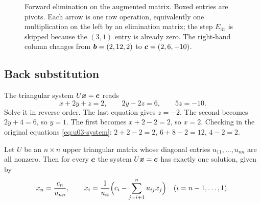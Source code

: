 \begin{figure}[ht]
\centering
\small
{}
\caption{Forward elimination on the augmented matrix. Boxed entries are pivots. Each arrow is
one row operation, equivalently one multiplication on the left by an elimination matrix; the
step $E_{31}$ is skipped because the $(3,1)$ entry is already zero. The right-hand column
changes from $\boldsymbol{b}=(2,12,2)$ to $\boldsymbol{c}=(2,6,-10)$.}\label{fig:u03-flow}
\end{figure}

\subsection{Back substitution}

The triangular system $U\boldsymbol{x}=\boldsymbol{c}$ reads
\[
  x+2y+z=2,\qquad 2y-2z=6,\qquad 5z=-10 .
\]
Solve it in reverse order. The last equation gives $z=-2$. The second becomes
$2y+4=6$, so $y=1$. The first becomes $x+2-2=2$, so $x=2$. Checking in the original
equations \eqref{eq:u03-system}: $2+2-2=2$, $6+8-2=12$, $4-2=2$.

\begin{proposition}\label{prop:u03-back}
Let $U$ be an $n\times n$ upper triangular matrix whose diagonal entries $u_{11},\dots,u_{nn}$
are all nonzero. Then for every $\boldsymbol{c}$ the system $U\boldsymbol{x}=\boldsymbol{c}$ has exactly one
solution, given by
\[
  x_n=\frac{c_n}{u_{nn}},\qquad
  x_i=\frac{1}{u_{ii}}\Bigl(c_i-\sum_{j=i+1}^{n}u_{ij}x_j\Bigr)\quad (i=n-1,\dots,1).
\]
\end{proposition}

